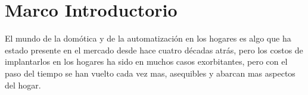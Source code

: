 

\chapter{Marco Introductorio}

El mundo de la domótica y de la automatización en los hogares es algo que ha estado presente en el mercado desde hace cuatro décadas atrás, pero los costos de implantarlos en los hogares ha sido en muchos casos exorbitantes, pero con el paso del tiempo se han vuelto cada vez mas, asequibles y abarcan mas aspectos del hogar.\\





